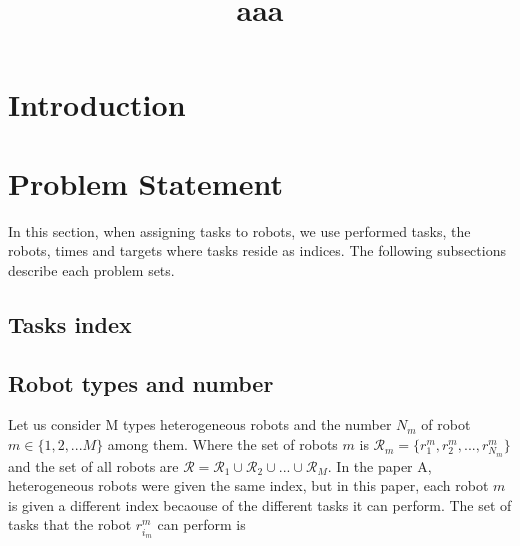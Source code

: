 \documentclass[]{interact}
\theoremstyle{plain}%
\theoremstyle{definition}
\theoremstyle{remark}
\begin{document}

\title{aaa}

\author{
}

\maketitle

\begin{abstract}

\end{abstract}

\begin{keywords}
\end{keywords}


\section{Introduction}

\section{Problem Statement}
In this section, when assigning tasks to robots, we use performed tasks, the robots, times and targets where tasks reside as indices.
The following subsections describe each problem sets.

\subsection{Tasks index}


\subsection{Robot types and number}
Let us consider M types heterogeneous robots and the number $N_m$ of robot $m\in\{1,2,...M\}$ among them.
Where the set of robots $m$ is $\mathcal{R}_m=\{r^m_1,r^m_2,...,r^m_{N_m}\}$ and the set of all robots are $\mathcal{R}=\mathcal{R}_1\cup\mathcal{R}_2\cup ... \cup\mathcal{R}_M$.
In the paper A, heterogeneous robots were given the same index, but in this paper, each robot $m$ is given a different index becaouse of the different tasks it can perform.
The set of tasks that the robot $r^m_{i_m}$ can perform is 
\end{document}
